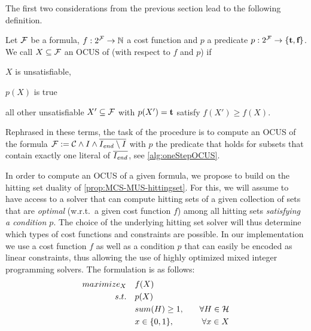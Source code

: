 The first two considerations from the previous section lead to the following definition. 


\begin{definition}
   Let $\mathcal{F} $ be a formula, $f:2^{\mathcal{F} } \to \mathbb{N}$ a cost function and  $p$ a predicate $p: 2^{\mathcal{F} }\to \{\textbf{t},\textbf{f}\}$. We call %
    $X \subseteq \mathcal{F} $ an OCUS of \formula (with respect to $f$ and $p$) if \begin{compactitem}                                      
      \item $X$ is unsatisfiable,
      \item $p(X)$ is true
      \item all other unsatisfiable $X'\subseteq \mathcal{F} $ with $p(X')=\textbf{t}$ satisfy $f(X')\geq f(X)$.
    \end{compactitem}
\end{definition}

Rephrased in these terms, the task of the procedure \onestep is to compute an OCUS of the formula $\mathcal{F}  := \mathcal{C} \land I\land \overline{I_\mathit{end} \setminus I}$ with $p$ the predicate that holds for subsets  that contain exactly one literal of $\overline{I_\mathit{end} }$, see \cref{alg:oneStepOCUS}. 


In order to compute an OCUS of a given formula, we propose to build on the hitting set duality of \cref{prop:MCS-MUS-hittingset}. 
For this, we will assume to have access to a solver \cohs that can compute hitting sets of a given collection of sets that are \emph{optimal} (w.r.t.\ a given cost function $f$) among all hitting sets \emph{satisfying a condition $p$}. 
The choice of the underlying hitting set solver will thus determine which types of cost functions and constraints are possible. 
In our implementation we use a cost function $f$ as well as a condition $p$ that can easily be encoded as linear constraints, thus allowing the use of highly optimized mixed integer programming solvers. The \cohs formulation is as follows:
\begin{align*}
  maximize_X \quad & f(X)\\
  s.t. \quad & p(X) \\
       & sum(H) \geq 1, \quad &\forall H \in \mathcal{H}  \\
       & x \in \{0,1\}, \quad &\forall x \in X
\end{align*}

